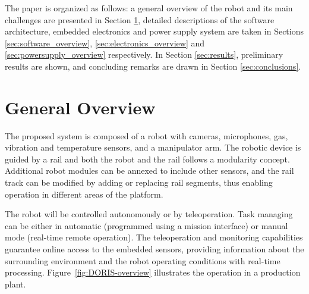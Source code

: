 \documentclass{ifacconf}
\begin{document}
The paper is organized as follows: a general overview of the robot and its main
challenges are presented in Section \ref{sec:general_overview}, detailed
descriptions of the software architecture, embedded electronics and power supply
system are taken in Sections \ref{sec:software_overview},
\ref{sec:electronics_overview} and \ref{sec:powersupply_overview} respectively.
In Section \ref{sec:results}, preliminary results are shown, and concluding
remarks are drawn in Section \ref{sec:conclusions}. 

% 


\section{General Overview}\label{sec:general_overview}

The proposed system is composed of a robot with cameras, microphones, gas,
vibration and temperature sensors, and a manipulator arm. The robotic device is
guided by a rail and both the robot and the rail follows a modularity concept.
Additional robot modules can be annexed to include other sensors, and the rail
track can be modified by adding or replacing rail segments, thus enabling
operation in different areas of the platform.%

The robot will be controlled autonomously or by teleoperation. Task managing
can be either in automatic (programmed using a mission interface) or manual
mode (real-time remote operation). The teleoperation and monitoring
capabilities guarantee online access to the embedded sensors, providing
information about the surrounding environment and the robot operating
conditions with real-time processing. Figure~\ref{fig:DORIS-overview}
illustrates the operation in a production plant.

\end{document}
